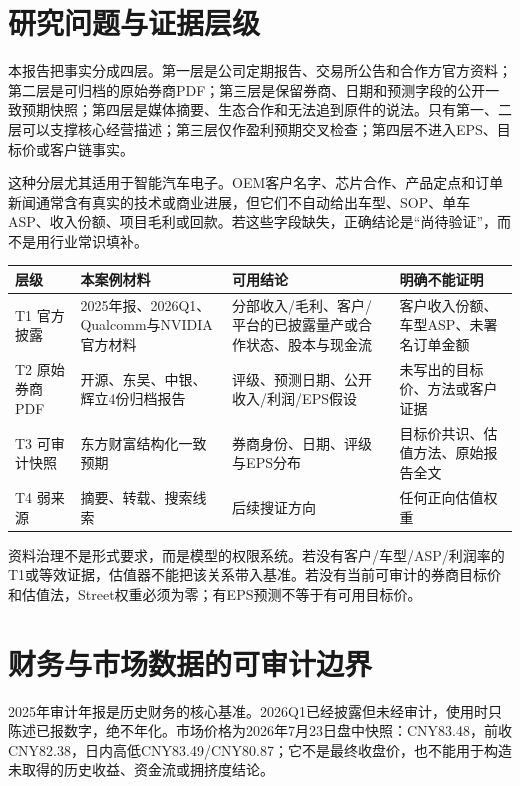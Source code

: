 \section{研究问题与证据层级}

本报告把事实分成四层。第一层是公司定期报告、交易所公告和合作方官方资料；第二层是可归档的原始券商PDF；第三层是保留券商、日期和预测字段的公开一致预期快照；第四层是媒体摘要、生态合作和无法追到原件的说法。只有第一、二层可以支撑核心经营描述；第三层仅作盈利预期交叉检查；第四层不进入EPS、目标价或客户链事实。

这种分层尤其适用于智能汽车电子。OEM客户名字、芯片合作、产品定点和订单新闻通常含有真实的技术或商业进展，但它们不自动给出车型、SOP、单车ASP、收入份额、项目毛利或回款。若这些字段缺失，正确结论是“尚待验证”，而不是用行业常识填补。

\begin{exhibitbox}[来源层级与可用范围]
\small
\begin{tabularx}{\textwidth}{L{2.2cm}L{2.6cm}Y Y}
\toprule
层级 & 本案例材料 & 可用结论 & 明确不能证明 \\
\midrule
T1 官方披露 & 2025年报、2026Q1、Qualcomm与NVIDIA官方材料 & 分部收入/毛利、客户/平台的已披露量产或合作状态、股本与现金流 & 客户收入份额、车型ASP、未署名订单金额 \\
T2 原始券商PDF & 开源、东吴、中银、辉立4份归档报告 & 评级、预测日期、公开收入/利润/EPS假设 & 未写出的目标价、方法或客户证据 \\
T3 可审计快照 & 东方财富结构化一致预期 & 券商身份、日期、评级与EPS分布 & 目标价共识、估值方法、原始报告全文 \\
T4 弱来源 & 摘要、转载、搜索线索 & 后续搜证方向 & 任何正向估值权重 \\
\bottomrule
\end{tabularx}
\end{exhibitbox}

资料治理不是形式要求，而是模型的权限系统。若没有客户/车型/ASP/利润率的T1或等效证据，估值器不能把该关系带入基准。若没有当前可审计的券商目标价和估值法，Street权重必须为零；有EPS预测不等于有可用目标价。

\section{财务与市场数据的可审计边界}

2025年审计年报是历史财务的核心基准。2026Q1已经披露但未经审计，使用时只陈述已报数字，绝不年化。市场价格为2026年7月23日盘中快照：CNY83.48，前收CNY82.38，日内高低CNY83.49/CNY80.87；它不是最终收盘价，也不能用于构造未取得的历史收益、资金流或拥挤度结论。

